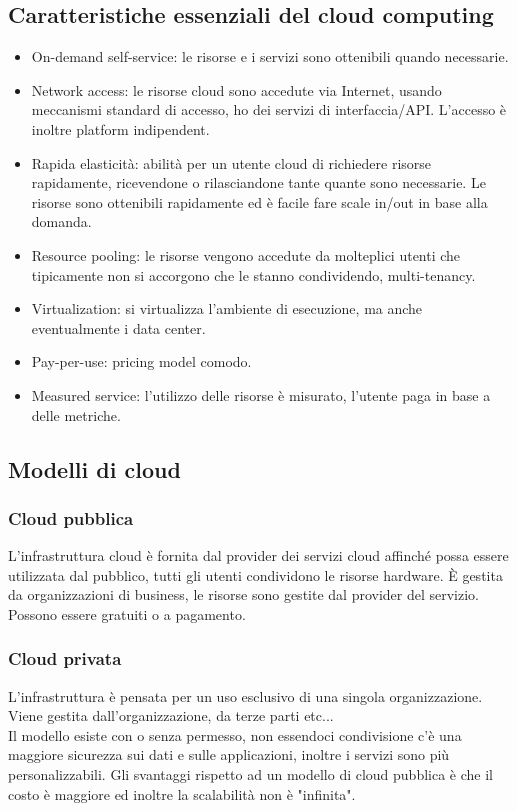 \documentclass{article}
\begin{document}
\subsection{Caratteristiche essenziali del cloud computing}
\begin{itemize}
\item On-demand self-service: le risorse e i servizi sono ottenibili quando necessarie.
\item Network access: le risorse cloud sono accedute via Internet, usando meccanismi standard di accesso, ho dei servizi di interfaccia/API. L'accesso è inoltre platform indipendent.
\item Rapida elasticità: abilità per un utente cloud di richiedere risorse rapidamente, ricevendone o rilasciandone tante quante sono necessarie. Le risorse sono ottenibili rapidamente ed è facile fare scale in/out in base alla domanda.
\item Resource pooling: le risorse vengono accedute da molteplici utenti che tipicamente non si accorgono che le stanno condividendo, multi-tenancy.
\item Virtualization: si virtualizza l'ambiente di esecuzione, ma anche eventualmente i data center.
\item Pay-per-use: pricing model comodo.
\item Measured service: l'utilizzo delle risorse è misurato, l'utente paga in base a delle metriche.
\end{itemize} 
\subsection{Modelli di cloud}
\subsubsection{Cloud pubblica}
L'infrastruttura cloud è fornita dal provider dei servizi cloud affinché possa essere utilizzata dal pubblico, tutti gli utenti condividono le risorse hardware. È gestita da organizzazioni di business, le risorse sono gestite dal provider del servizio. Possono essere gratuiti o a pagamento.
\subsubsection{Cloud privata}
L'infrastruttura è pensata per un uso esclusivo di una singola organizzazione. Viene gestita dall'organizzazione, da terze parti etc...\\ Il modello esiste con o senza permesso, non essendoci condivisione c'è una maggiore sicurezza sui dati e sulle applicazioni, inoltre i servizi sono più personalizzabili. Gli svantaggi rispetto ad un modello di cloud pubblica  è che il costo è maggiore ed inoltre la scalabilità non è "infinita".
\end{document}
